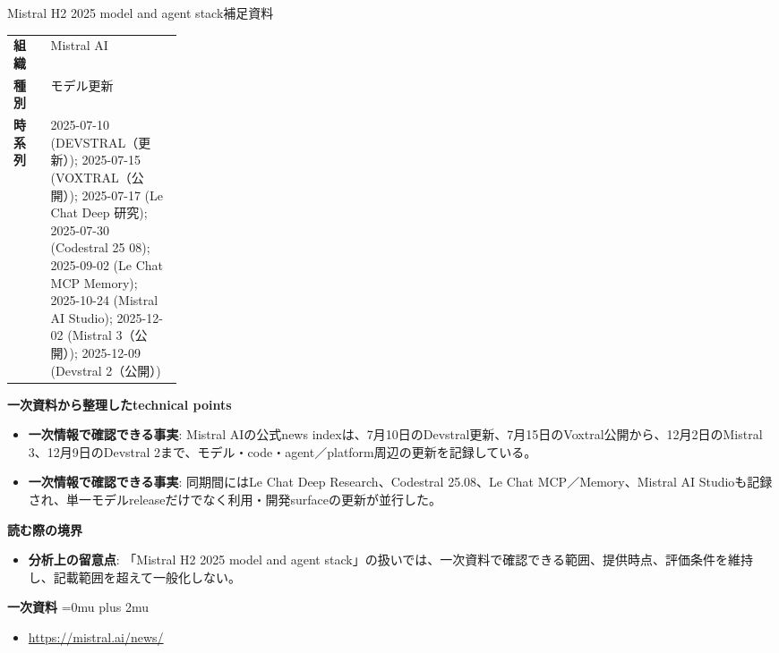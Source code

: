 \begin{technicalnote}{Mistral H2 2025 model and agent stack}{補足資料}
\begingroup
\begin{tabularx}{\linewidth}{@{}>{\bfseries}p{0.22\linewidth}X@{}}
組織 & Mistral AI \\
種別 & モデル更新 \\
時系列 & 2025-07-10 (DEVSTRAL（更新）); 2025-07-15 (VOXTRAL（公開）); 2025-07-17 (Le Chat Deep 研究); 2025-07-30 (Codestral 25 08); 2025-09-02 (Le Chat MCP Memory); 2025-10-24 (Mistral AI Studio); 2025-12-02 (Mistral 3（公開）); 2025-12-09 (Devstral 2（公開）) \\
\end{tabularx}
\smallskip
{\bfseries 一次資料から整理したtechnical points}
\begin{itemize}[leftmargin=1.5em,itemsep=0.35em]
\item \textbf{一次情報で確認できる事実}: Mistral AIの公式news indexは、7月10日のDevstral更新、7月15日のVoxtral公開から、12月2日のMistral 3、12月9日のDevstral 2まで、モデル・code・agent／platform周辺の更新を記録している。
\item \textbf{一次情報で確認できる事実}: 同期間にはLe Chat Deep Research、Codestral 25.08、Le Chat MCP／Memory、Mistral AI Studioも記録され、単一モデルreleaseだけでなく利用・開発surfaceの更新が並行した。
\end{itemize}
\begin{minipage}{\linewidth}
{\bfseries 読む際の境界}
\begin{itemize}[leftmargin=1.5em,itemsep=0.35em]
\item \textbf{分析上の留意点}: 「Mistral H2 2025 model and agent stack」の扱いでは、一次資料で確認できる範囲、提供時点、評価条件を維持し、記載範囲を超えて一般化しない。
\end{itemize}
\begin{samepage}
{\bfseries 一次資料}
\begingroup\sloppy
\Urlmuskip=0mu plus 2mu\relax
\begin{itemize}[leftmargin=1.5em,itemsep=0.25em]
\item {\scriptsize\url{https://mistral.ai/news/}}
\end{itemize}
\endgroup
\end{samepage}
\end{minipage}
\endgroup
\end{technicalnote}
\medskip

